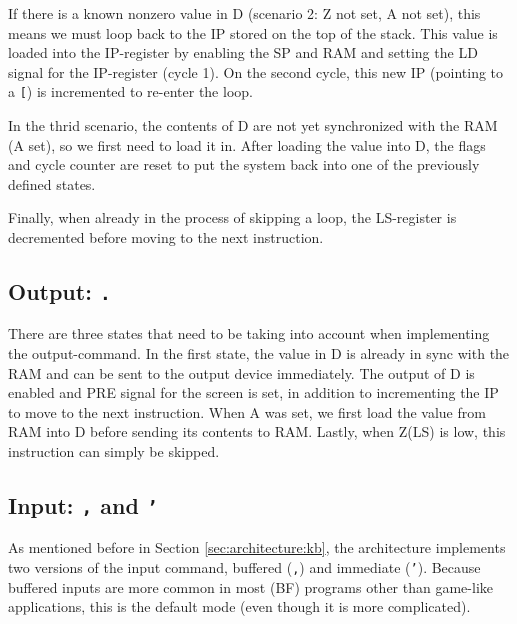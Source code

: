 If there is a known nonzero value in D (scenario 2: Z not set, A not set), this means we must loop back to the IP stored on the top of the stack. This value is loaded into the IP-register by enabling the SP and RAM and setting the LD signal for the IP-register (cycle 1). On the second cycle, this new IP (pointing to a \texttt{[}) is incremented to re-enter the loop.
  
In the thrid scenario, the contents of D are not yet synchronized with the RAM (A set), so we first need to load it in. After loading the value into D, the flags and cycle counter are reset to put the system back into one of the previously defined states.

Finally, when already in the process of skipping a loop, the LS-register is decremented before moving to the next instruction.

\subsection{Output: \texttt{.}}
There are three states that need to be taking into account when implementing the output-command. In the first state, the value in D is already in sync with the RAM and can be sent to the output device immediately. The output of D is enabled and PRE signal for the screen is set, in addition to incrementing the IP to move to the next instruction. When A was set, we first load the value from RAM into D before sending its contents to RAM. Lastly, when Z(LS) is low, this instruction can simply be skipped.

\subsection{Input: \texttt{,} and \texttt{'}}
As mentioned before in Section \ref{sec:architecture:kb}, the architecture implements two versions of the input command, buffered (\texttt{,}) and immediate (\texttt{'}). Because buffered inputs are more common in most (BF) programs other than game-like applications, this is the default mode (even though it is more complicated).

